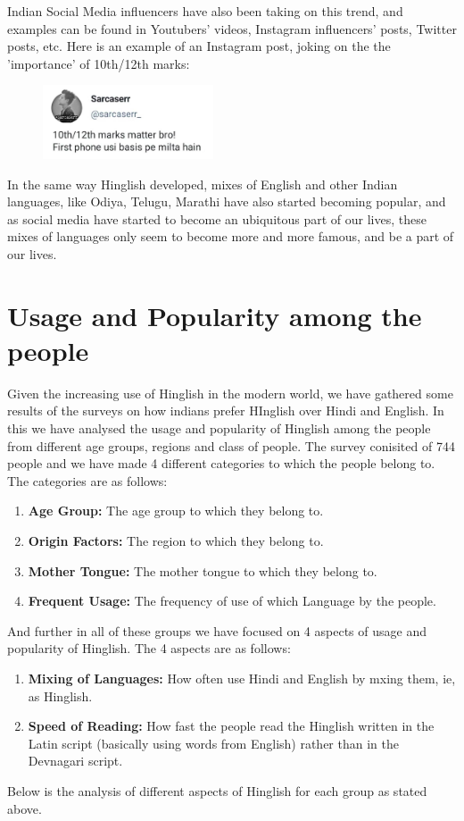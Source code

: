\documentclass{article}
\begin{document}
Indian Social Media influencers have also been taking on this trend, and examples can be found in Youtubers' videos, Instagram influencers' posts, Twitter posts, etc. Here is an example of an Instagram post, joking on the the 'importance' of 10th/12th marks:

\begin{figure}[H]
\centering
\includegraphics[width=0.45\textwidth]{images/meme.png}
\end{figure}

In the same way Hinglish developed, mixes of English and other Indian languages, like Odiya, Telugu, Marathi have also started becoming popular, and as social media have started to become an ubiquitous part of our lives, these mixes of languages only seem to become more and more famous, and be a part of our lives.


\section{Usage and Popularity among the people}
Given the increasing use of Hinglish in the modern world, we have gathered some results of the surveys on how indians prefer HInglish over Hindi and English. In this we have analysed the usage and popularity of Hinglish among the people from different age groups, regions and class of people. The survey conisited of 744 people and we have made 4 different categories to which the people belong to. The categories are as follows:
\begin{enumerate}
    \item \textbf{Age Group:} The age group to which they belong to.
    \item \textbf{Origin Factors:} The region to which they belong to.
    \item \textbf{Mother Tongue:} The mother tongue to which they belong to.
    \item \textbf{Frequent Usage:} The frequency of use of which Language by the people.
\end{enumerate}
And further in all of these groups we have focused on 4 aspects of usage and popularity of Hinglish. The 4 aspects are as follows:

\begin{enumerate}
    \item \textbf{Mixing of Languages:} How often use Hindi and English by mxing them, ie, as Hinglish.
    \item \textbf{Speed of Reading:} How fast the people read the Hinglish written in the Latin script (basically using words from English) rather than in the Devnagari script.
\end{enumerate}
Below is the analysis of different aspects of Hinglish for each group as stated above.
\end{document}
